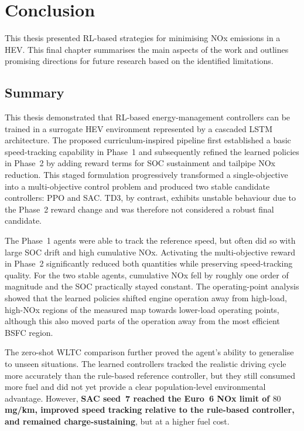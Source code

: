 \chapter{Conclusion}
\label{chap:conclusion}

This thesis presented \ac{RL}-based strategies for minimising \ac{NOx} emissions in a \ac{HEV}. This final chapter summarises the main aspects of the work and outlines promising directions for future research based on the identified limitations.

\section{Summary}
This thesis demonstrated that \ac{RL}-based energy-management controllers can be trained in a surrogate \ac{HEV} environment represented by a cascaded \ac{LSTM} architecture. The proposed curriculum-inspired pipeline first established a basic speed-tracking capability in Phase~1 and subsequently refined the learned policies in Phase~2 by adding reward terms for \ac{SOC} sustainment and tailpipe \ac{NOx} reduction. This staged formulation progressively transformed a single-objective into a multi-objective control problem and produced two stable candidate controllers: \ac{PPO} and \ac{SAC}. \ac{TD3}, by contrast, exhibits unstable behaviour due to the Phase~2 reward change and was therefore not considered a robust final candidate.

The Phase~1 agents were able to track the reference speed, but often did so with large \ac{SOC} drift and high cumulative \ac{NOx}. Activating the multi-objective reward in Phase~2 significantly reduced both quantities while preserving speed-tracking quality. For the two stable agents, cumulative \ac{NOx} fell by roughly one order of magnitude and the \ac{SOC} practically stayed constant. The operating-point analysis showed that the learned policies shifted engine operation away from high-load, high-\ac{NOx} regions of the measured map towards lower-load operating points, although this also moved parts of the operation away from the most efficient \ac{BSFC} region.

The zero-shot \ac{WLTC} comparison further proved the agent's ability to generalise to unseen situations. The learned controllers tracked the realistic driving cycle more accurately than the rule-based reference controller, but they still consumed more fuel and did not yet provide a clear population-level environmental advantage. However, \textbf{SAC seed~7 reached the Euro~6 \ac{NOx} limit of $80$\,mg/km, improved speed tracking relative to the rule-based controller, and remained charge-sustaining}, but at a higher fuel cost.

